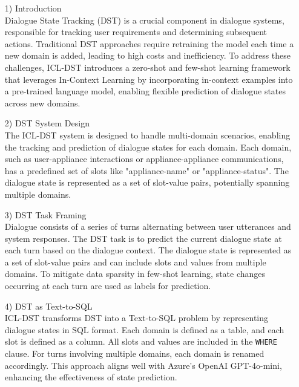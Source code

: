\documentclass[conference]{IEEEtran}
\begin{document}
\begin{enumerate}
\begin{itemize}
\begin{itemize}
\begin{enumerate}
\begin{itemize}
    \item [1)] Introduction \\
Dialogue State Tracking (DST) is a crucial component in dialogue systems, responsible for tracking user requirements and determining subsequent actions. Traditional DST approaches require retraining the model each time a new domain is added, leading to high costs and inefficiency. To address these challenges, ICL-DST introduces a zero-shot and few-shot learning framework that leverages In-Context Learning by incorporating in-context examples into a pre-trained language model, enabling flexible prediction of dialogue states across new domains. \\ 
\end{itemize}

\begin{itemize}
    \item [2)] DST System Design \\
The ICL-DST system is designed to handle multi-domain scenarios, enabling the tracking and prediction of dialogue states for each domain. Each domain, such as user-appliance interactions or appliance-appliance communications, has a predefined set of slots like "appliance-name" or "appliance-status". The dialogue state is represented as a set of slot-value pairs, potentially spanning multiple domains. \\
\end{itemize}

\begin{itemize}
    \item [3)] DST Task Framing \\
Dialogue consists of a series of turns alternating between user utterances and system responses. The DST task is to predict the current dialogue state at each turn based on the dialogue context. The dialogue state is represented as a set of slot-value pairs and can include slots and values from multiple domains. To mitigate data sparsity in few-shot learning, state changes occurring at each turn are used as labels for prediction. \\ 
\end{itemize}

\begin{itemize}
    \item [4)] DST as Text-to-SQL \\
ICL-DST transforms DST into a Text-to-SQL problem by representing dialogue states in SQL format. Each domain is defined as a table, and each slot is defined as a column. All slots and values are included in the \texttt{WHERE} clause. For turns involving multiple domains, each domain is renamed accordingly. This approach aligns well with Azure's OpenAI GPT-4o-mini, enhancing the effectiveness of state prediction. \\
\end{itemize}


\end{enumerate}
\end{itemize}
\end{itemize}
\end{enumerate}
\end{document}
